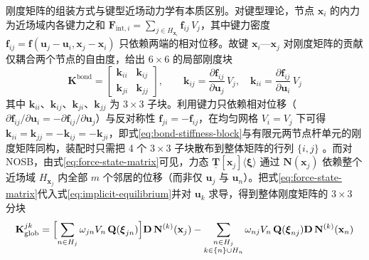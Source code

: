 刚度矩阵的组装方式与键型近场动力学有本质区别。对键型理论，节点 $\mathbf{x}_i$ 的内力为近场域内各键力之和 $\mathbf{F}_{\mathrm{int},i}=\sum_{j\in H_{\mathbf{x}_i}}\mathbf{f}_{ij}\,V_j$，其中键力密度 $\mathbf{f}_{ij}=\mathbf{f}(\mathbf{u}_j-\mathbf{u}_i,\mathbf{x}_j-\mathbf{x}_i)$ 只依赖两端的相对位移。故键 $\mathbf{x}_i$—$\mathbf{x}_j$ 对刚度矩阵的贡献仅耦合两个节点的自由度，给出 $6\times 6$ 的局部刚度块
\begin{equation}
  \mathbf{K}^{\mathrm{bond}}=\begin{bmatrix}
    \mathbf{k}_{ii} & \mathbf{k}_{ij}\\
    \mathbf{k}_{ji} & \mathbf{k}_{jj}
  \end{bmatrix},\qquad
  \mathbf{k}_{ij}=\frac{\partial\mathbf{f}_{ij}}{\partial\mathbf{u}_{j}}\,V_{j},\quad
  \mathbf{k}_{ii}=\frac{\partial\mathbf{f}_{ij}}{\partial\mathbf{u}_{i}}\,V_{j}
  \label{eq:bond-stiffness-block}
\end{equation}
其中 $\mathbf{k}_{ii}$、$\mathbf{k}_{ij}$、$\mathbf{k}_{ji}$、$\mathbf{k}_{jj}$ 为 $3\times 3$ 子块。利用键力只依赖相对位移（$\partial\mathbf{f}_{ij}/\partial\mathbf{u}_{i}=-\partial\mathbf{f}_{ij}/\partial\mathbf{u}_{j}$）与反对称性 $\mathbf{f}_{ji}=-\mathbf{f}_{ij}$，在均匀网格 $V_i=V_j$ 下可得 $\mathbf{k}_{ii}=\mathbf{k}_{jj}=-\mathbf{k}_{ij}=-\mathbf{k}_{ji}$，即式\eqref{eq:bond-stiffness-block}与有限元两节点杆单元的刚度矩阵同构，装配时只需把 4 个 $3\times 3$ 子块散布到整体矩阵的行列 $\{i,j\}$ \cite{Macek2007}。而对 NOSB，由式\eqref{eq:force-state-matrix}可见，力态 $\underline{\mathbf{T}}[\mathbf{x}_j]\langle\boldsymbol{\xi}\rangle$ 通过 $\mathbf{N}(\mathbf{x}_j)$ 依赖整个近场域 $H_{\mathbf{x}_j}$ 内全部 $m$ 个邻居的位移（而非仅 $\mathbf{u}_j$ 与 $\mathbf{u}_n$）。把式\eqref{eq:force-state-matrix}代入式\eqref{eq:implicit-equilibrium}并对 $\mathbf{u}_k$ 求导，得到整体刚度矩阵的 $3\times 3$ 分块
\begin{equation}
  \mathbf{K}_{\mathrm{glob}}^{jk}
  =\Bigl[\sum_{n\in H_{j}}\omega_{jn}V_n\,\mathbf{Q}(\boldsymbol{\xi}_{jn})\Bigr]\mathbf{D}\,\mathbf{N}^{(k)}(\mathbf{x}_j)
  -\sum_{\substack{n\in H_{j}\\ k\in\{n\}\cup H_{n}}}\omega_{nj}V_n\,\mathbf{Q}(\boldsymbol{\xi}_{nj})\mathbf{D}\,\mathbf{N}^{(k)}(\mathbf{x}_n)
  \label{eq:family-stiffness-block}
\end{equation}

